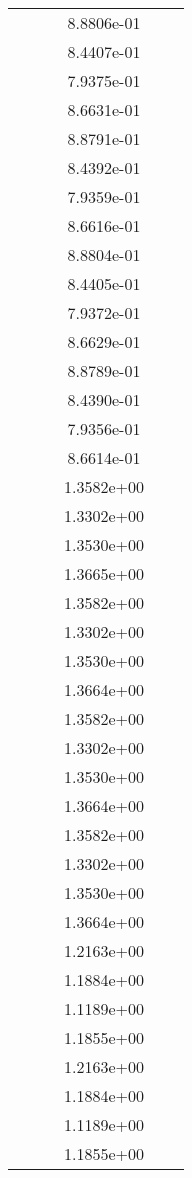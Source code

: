 \begin{xltabular}{\textwidth}{r|rS[table-format=1.3e+2]S[table-format=1.4e+2]S[table-format=1.4e+2]S[table-format=-1.5]}
&  &  & 8.8806e-01 & & \\
&  &  & 8.4407e-01 & & \\
&  &  & 7.9375e-01 & & \\
&  &  & 8.6631e-01 & & \\
&  &  & 8.8791e-01 & & \\
&  &  & 8.4392e-01 & & \\
&  &  & 7.9359e-01 & & \\
&  &  & 8.6616e-01 & & \\
&  &  & 8.8804e-01 & & \\
&  &  & 8.4405e-01 & & \\
&  &  & 7.9372e-01 & & \\
&  &  & 8.6629e-01 & & \\
&  &  & 8.8789e-01 & & \\
&  &  & 8.4390e-01 & & \\
&  &  & 7.9356e-01 & & \\
&  &  & 8.6614e-01 & & \\
&  &  & 1.3582e+00 & & \\
&  &  & 1.3302e+00 & & \\
&  &  & 1.3530e+00 & & \\
&  &  & 1.3665e+00 & & \\
&  &  & 1.3582e+00 & & \\
&  &  & 1.3302e+00 & & \\
&  &  & 1.3530e+00 & & \\
&  &  & 1.3664e+00 & & \\
&  &  & 1.3582e+00 & & \\
&  &  & 1.3302e+00 & & \\
&  &  & 1.3530e+00 & & \\
&  &  & 1.3664e+00 & & \\
&  &  & 1.3582e+00 & & \\
&  &  & 1.3302e+00 & & \\
&  &  & 1.3530e+00 & & \\
&  &  & 1.3664e+00 & & \\
&  &  & 1.2163e+00 & & \\
&  &  & 1.1884e+00 & & \\
&  &  & 1.1189e+00 & & \\
&  &  & 1.1855e+00 & & \\
&  &  & 1.2163e+00 & & \\
&  &  & 1.1884e+00 & & \\
&  &  & 1.1189e+00 & & \\
&  &  & 1.1855e+00 & & \\

\end{xltabular}
